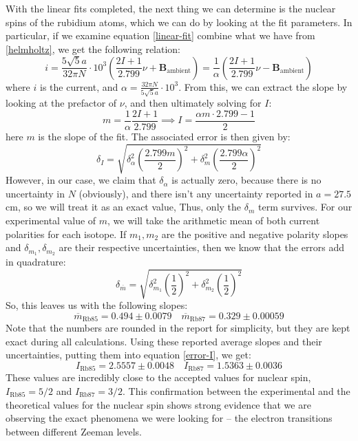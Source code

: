 \documentclass[10pt]{article}
\begin{document}
	With the linear fits completed, the next thing we can determine is the nuclear
	spins of the rubidium atoms, which we can do by looking at the fit parameters. In
	particular, if we examine equation \ref{linear-fit} combine what we have from
	\ref{helmholtz}, we get the following relation:
	\begin{equation}
		\label{linear-fit-expanded}
		i = \frac{5\sqrt{5}a}{32 \pi N} \cdot 10^{3} \left( \frac{2I + 1}{2.799}\nu +
		\mathbf{B}_\text{ambient}\right) = \frac{1}{\alpha}\left( \frac{2I +
		1}{2.799}\nu - \mathbf{B}_\text{ambient} \right)
	\end{equation}
	where \( i \) is the current, and \( \alpha = \frac{32 \pi N}{5\sqrt{5}a} \cdot
	10^{3} \). 
	From this, we can extract the slope by looking at
	the prefactor of \( \nu \), and then ultimately solving for \( I \): 
	\[
		m = \frac{1}{\alpha} \frac{2I + 1}{2.799} \implies I = \frac{\alpha m \cdot
		2.799 - 1}{2}
	\]
	here \( m \) is the slope of the fit. The associated error is then given by:
	\begin{equation}
		\label{error-I}
		\delta_I = \sqrt{\delta_{\alpha}^2 \left( \frac{2.799m}{2}\right)^2 
			+ \delta_m^2\left( \frac{2.799 \alpha}{2}\right)^2}
	\end{equation}
	However, in our case, we claim that \( \delta_{\alpha} \) is actually zero,
	because there is no uncertainty in \( N \) (obviously), and there isn't any
	uncertainty reported in \( a = 27.5 \) cm, so we will treat it as an exact value,
	Thus, only the \( \delta_m \) term survives.  
	For our experimental value of \( m \), we will take the arithmetic mean
	of both current polarities for each isotope. If \( m_1, m_2 \) are the positive
	and negative polarity slopes and \( \delta_{m_1}, \delta_{m_2} \) are their
	respective uncertainties, then we know that the errors add in quadrature:
	\[
		\delta_{\overline m} = \sqrt{\delta_{m_1}^2\left( \frac{1}{2} \right)^2 +
		\delta_{m_2}^2\left( \frac{1}{2} \right)^2}
	\]
	So, this leaves us with the following slopes:
	\[
		\overline m_\text{Rb85} = 0.494 \pm 0.0079 \quad 
		\overline m_\text{Rb87} = 0.329 \pm 0.00059
	\]
	Note that the numbers are rounded in the report for simplicity, but they are kept
	exact during all calculations. Using these reported average slopes and their
	uncertainties, putting them into equation \ref{error-I}, we get:
	\[
		I_\text{Rb85} = 2.5557 \pm 0.0048 \quad
		I_\text{Rb87} = 1.5363 \pm 0.0036
	\]
	These values are incredibly close to the accepted values for nuclear spin, \(
	I_\text{Rb85} = 5 / 2 \) and \( I_\text{Rb87} = 3 / 2 \). This confirmation
	between the experimental and the theoretical values for the nuclear spin shows
	strong evidence that we are observing the exact phenomena we were looking for --
	the electron transitions between different Zeeman levels. 
\end{document}
